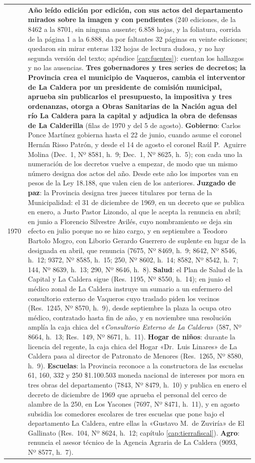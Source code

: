 \begin{longtable}{@{}p{2.7cm}p{10.3cm}@{}}
1970 & \textbf{Año leído edición por edición, con sus actos del departamento mirados sobre la imagen y con pendientes} (240 ediciones, de la 8462 a la 8701, sin ninguna ausente; 6.858 hojas, y la foliatura, corrida de la página 1 a la 6.888, da por faltantes 32 páginas en veinte ediciones; quedaron sin mirar enteras 132 hojas de lectura dudosa, y no hay segunda versión del texto; apéndice \ref{cap:fuentes}): cuentan los hallazgos y no las ausencias. \textbf{Tres gobernadores y tres series de decretos; la Provincia crea el municipio de Vaqueros, cambia el interventor de La Caldera por un presidente de comisión municipal, aprueba sin publicarlos el presupuesto, la impositiva y tres ordenanzas, otorga a Obras Sanitarias de la Nación agua del río La Caldera para la capital y adjudica la obra de defensas de La Calderilla} (filas de 1970 y del 5 de agosto). \textbf{Gobierno}: Carlos Ponce Martínez gobierna hasta el 22 de junio, cuando asume el coronel Hernán Risso Patrón, y desde el 14 de agosto el coronel Raúl P.\ Aguirre Molina (Dec.\ 1, Nº 8581, h.\ 9; Dec.\ 1, Nº 8625, h.\ 5); con cada uno la numeración de los decretos vuelve a empezar, de modo que un mismo número designa dos actos del año. Desde este año los importes van en pesos de la Ley 18.188, que valen cien de los anteriores. \textbf{Juzgado de paz}: la Provincia designa tres jueces titulares por terna de la Municipalidad: el 31 de diciembre de 1969, en un decreto que se publica en enero, a Justo Pastor Lizondo, al que le acepta la renuncia en abril; en junio a Florencio Silvestre Avilés, cuyo nombramiento se deja sin efecto en julio porque no se hizo cargo, y en septiembre a Teodoro Bartolo Mogro, con Liborio Gerardo Guerrero de suplente en lugar de la designada en abril, que renuncia (7675, Nº 8469, h.\ 9; 8642, Nº 8546, h.\ 12; 9372, Nº 8585, h.\ 15; 250, Nº 8602, h.\ 14; 8582, Nº 8542, h.\ 7; 144, Nº 8639, h.\ 13; 290, Nº 8646, h.\ 8). \textbf{Salud}: el Plan de Salud de la Capital y La Caldera sigue (Res.\ 1195, Nº 8550, h.\ 14); en junio el médico zonal de La Caldera instruye un sumario a un enfermero del consultorio externo de Vaqueros cuyo traslado piden los vecinos (Res.\ 1245, Nº 8570, h.\ 9), desde septiembre la plaza la ocupa otro médico, contratado hasta fin de año, y en noviembre una resolución amplía la caja chica del «\textit{Consultorio Externo de La Caldera}» (587, Nº 8664, h.\ 13; Res.\ 149, Nº 8671, h.\ 11). \textbf{Hogar de niños}: durante la licencia del regente, la caja chica del Hogar «Dr.\ Luis Linares» de La Caldera pasa al director de Patronato de Menores (Res.\ 1265, Nº 8580, h.\ 9). \textbf{Escuelas}: la Provincia reconoce a la constructora de las escuelas 61, 160, 332 y 250 \$1.100.503 moneda nacional de intereses por mora en tres obras del departamento (7843, Nº 8479, h.\ 10) y publica en enero el decreto de diciembre de 1969 que aprueba el personal del cerco de alambre de la 250, en Los Yacones (7697, Nº 8471, h.\ 11), y en agosto subsidia los comedores escolares de tres escuelas que pone bajo el departamento La Caldera, entre ellas la «Gustavo M.\ de Zuviría» de El Gallinato (Res.\ 104, Nº 8624, h.\ 12; capítulo \ref{cap:tierrafiscal}). \textbf{Agro}: renuncia el asesor técnico de la Agencia Agraria de La Caldera (9093, Nº 8577, h.\ 7). 
\end{longtable}
